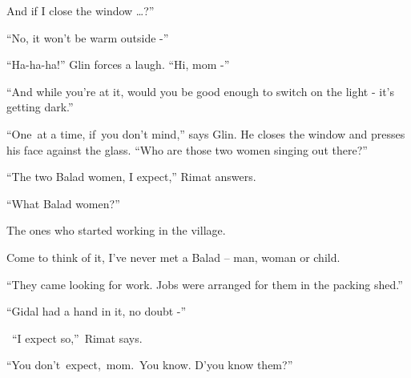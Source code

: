 \documentclass[letterpaper]{article}
\begin{document}
{\textquotedbl}And if I\textcolor[rgb]{0.13333334,0.13333334,0.13333334}{ close the window {\dots}?''}

\textcolor[rgb]{0.13333334,0.13333334,0.13333334}{{}``No, it won't be warm outside -''}

\textcolor[rgb]{0.13333334,0.13333334,0.13333334}{{}``Ha-ha-ha!'' Glin }forces a
laugh\textcolor[rgb]{0.13333334,0.13333334,0.13333334}{. ``Hi, mom -'' }

\textcolor[rgb]{0.13333334,0.13333334,0.13333334}{{}``And while you're at it, }would you be good enough to switch on the
light - \textcolor[rgb]{0.13333334,0.13333334,0.13333334}{it's getting dark.''}

\textcolor[rgb]{0.13333334,0.13333334,0.13333334}{{}``One~at a time, if~you }don't
mind\textcolor[rgb]{0.13333334,0.13333334,0.13333334}{,'' says Glin. He closes the window and presses his face against
the glass}.\textcolor[rgb]{0.13333334,0.13333334,0.13333334}{ ``Who are those
}two\textcolor[rgb]{0.0,0.4392157,0.7529412}{ }\textcolor[rgb]{0.13333334,0.13333334,0.13333334}{women singing out
there?''}

\textcolor[rgb]{0.13333334,0.13333334,0.13333334}{{}``The two Balad women, I
}expect\textcolor[rgb]{0.13333334,0.13333334,0.13333334}{,'' Rimat answers.}

\textcolor[rgb]{0.13333334,0.13333334,0.13333334}{{}``What Balad women?''}

{\textquotedbl}The ones who started working\textcolor[rgb]{0.13333334,0.13333334,0.13333334}{ in the
village.{\textquotedbl}\ \ \ \ \ \ \ \ }

\textcolor[rgb]{0.13333334,0.13333334,0.13333334}{{\textquotedbl}Come to think of it, I've never met a Balad -- man,
woman }or child.{\textquotedbl}

\textcolor[rgb]{0.13333334,0.13333334,0.13333334}{{}``They came looking for work. Jobs were arranged for them in the
packing }shed\textcolor[rgb]{0.13333334,0.13333334,0.13333334}{.''}

\textcolor[rgb]{0.13333334,0.13333334,0.13333334}{{}``Gidal had a hand in it, no doubt -''}

\textcolor[rgb]{0.13333334,0.13333334,0.13333334}{~``}I expect
so\textcolor[rgb]{0.13333334,0.13333334,0.13333334}{,''~Rimat says. }

\textcolor[rgb]{0.13333334,0.13333334,0.13333334}{{}``You
don't~}expect,~mom\textcolor[rgb]{0.13333334,0.13333334,0.13333334}{.~You know.
}D'y\textcolor[rgb]{0.13333334,0.13333334,0.13333334}{ou know them?''}
\end{document}
